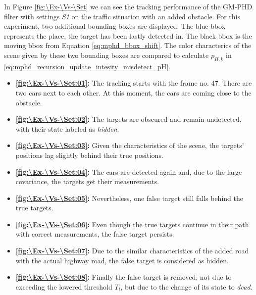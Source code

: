 In Figure \ref{fig:\Ex-\Vs-\Set} we can see the tracking performance of the GM-PHD filter with settings \textit{S1}
on the traffic situation with an added obstacle. For this experiment, two additional bounding boxes are displayed.
The blue bbox represents the place, the target has been lastly detected in. The black bbox is the moving bbox from Equation \eqref{eq:mphd_bbox_shift}. The color characterics of the scene given by these two bounding boxes are compared to calculate $p_{H,k}$ in \eqref{eq:mphd_recursion_update_intesity_misdetect_pH}.
\begin{itemize}
    \item \textbf{\ref{fig:\Ex-\Vs-\Set:01}:} The tracking starts with the frame no. 47. There are two cars next to each
    other. At this moment, the cars are coming close to the obstacle.
    \item \textbf{\ref{fig:\Ex-\Vs-\Set:02}:} The targets are obscured and remain undetected, with their state labeled as \textit{hidden}.
    \item \textbf{\ref{fig:\Ex-\Vs-\Set:03}:} Given the characteristics of the scene, the targets' positions lag slightly behind their true positions.
    \item \textbf{\ref{fig:\Ex-\Vs-\Set:04}:} The cars are detected again and, due to the large covariance, the
    targets get their measurements.
    \item \textbf{\ref{fig:\Ex-\Vs-\Set:05}:} Nevertheless, one false target still falls behind the true targets.
    \item \textbf{\ref{fig:\Ex-\Vs-\Set:06}:} Even though the true targets continue in their path with correct measurements, the false target persists.
    \item \textbf{\ref{fig:\Ex-\Vs-\Set:07}:} Due to the similar characteristics of the added road with the actual highway road, the false target is considered as hidden.
    \item \textbf{\ref{fig:\Ex-\Vs-\Set:08}:} Finally the false target is removed, not due to exceeding the lowered threshold $T_l$, but due to the change of its state to \textit{dead}.
\end{itemize}

